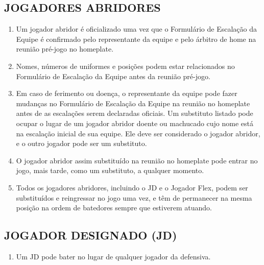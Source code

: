 \begin{multicols}{2}
	\subsection{JOGADORES ABRIDORES} 
	
	\begin{enumerate}[label=\alph*)]
		\item Um jogador abridor \'e oficializado uma vez que o Formul\'ario de Escala\c{c}\~ao da Equipe 
		\'e confirmado pelo representante da equipe e pelo \'arbitro de \gls{home} na reuni\~ao pr\'e-jogo no \gls{homeplate}. 
		
		\item  Nomes, n\'umeros de uniformes e posi\c{c}\~oes podem estar relacionados no Formul\'ario de Escala\c{c}\~ao da Equipe antes da reuni\~ao pr\'e-jogo. 
		
		\item  Em caso de ferimento ou doen\c{c}a, o representante da equipe pode fazer mudan\c{c}as no Formul\'ario de Escala\c{c}\~ao da Equipe na reuni\~ao no \gls{homeplate} antes de as escala\c{c}\~oes serem declaradas oficiais. Um substituto listado pode ocupar o lugar de um jogador abridor doente ou machucado cujo nome est\'a na escala\c{c}\~ao inicial de sua equipe. Ele deve ser considerado o jogador abridor, e o outro jogador pode ser um substituto. 
		
		\item  O jogador abridor assim substitu\'ido na reuni\~ao no \gls{homeplate} pode entrar no jogo, mais tarde, como um substituto, a qualquer momento.
		\item Todos os jogadores abridores, incluindo o JD e o Jogador Flex, podem ser substitu\'idos e reingressar no jogo uma vez, e t\^em de permanecer na mesma posi\c{c}\~ao na ordem de batedores sempre que estiverem atuando. 
	\end{enumerate}
	\subsection{JOGADOR DESIGNADO (JD)} 
	
	\begin{enumerate}[label=\alph*)]
		\item Um JD pode bater no lugar de qualquer jogador da defensiva. 
		

\end{enumerate}
\end{multicols}
